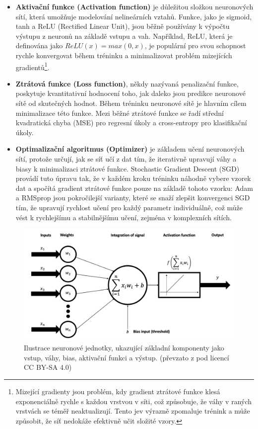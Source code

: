 \documentclass[male,czech,api_ing]{thesis}
\begin{document}
\begin{itemize}
\begin{itemize}
        \end{itemize}
    \item \textbf{Aktivační funkce (Activation function)} je důležitou složkou neuronových sítí, která umožňuje modelování nelineárních vztahů. Funkce, jako je sigmoid, tanh a ReLU (Rectified Linear Unit), jsou běžně používány k výpočtu výstupu z neuronů na základě vstupu a vah. Například, ReLU, která je definována jako $ReLU(x) = max(0, x)$, je populární pro svou schopnost rychle konvergovat během tréninku a minimalizovat problém mizejících gradientů\footnote{Mizející gradienty jsou problém, kdy gradient ztrátové funkce klesá exponenciálně rychle s každou vrstvou v síti, což způsobuje, že váhy v raných vrstvách se téměř neaktualizují. Tento jev výrazně zpomaluje trénink a může způsobit, že síť nedokáže efektivně učit složité vzory.}.
    \item \textbf{Ztrátová funkce (Loss function)}, někdy nazývaná penalizační funkce, poskytuje kvantitativní hodnocení toho, jak daleko jsou predikce neuronové sítě od skutečných hodnot. Během tréninku neuronové sítě je hlavním cílem minimalizace této funkce. Mezi běžné ztrátové funkce se řadí střední kvadratická chyba (MSE) pro regresní úkoly a cross-entropy pro klasifikační úkoly. 
    \item \textbf{Optimalizační algoritmus (Optimizer)} je základem učení neuronových sítí, protože určují, jak se síť učí z dat tím, že iterativně upravují váhy a biasy k minimalizaci ztrátové funkce. Stochastic Gradient Descent (SGD) provádí tuto úpravu tak, že v každém kroku tréninku náhodně vybere vzorek dat a spočítá gradient ztrátové funkce pouze na základě tohoto vzorku:
    Adam a RMSprop jsou pokročilejší varianty, které se snaží zlepšit konvergenci SGD tím, že upravují rychlost učení pro každý parametr individuálně, což může vést k rychlejšímu a stabilnějšímu učení, zejména v komplexních sítích.
\end{itemize}

\begin{figure}[ht]
    \centering
    \includegraphics[width=\linewidth]{Prilohy/Obrazky/NNComponents.png}
    \caption{Ilustrace neuronové jednotky, ukazující základní komponenty jako vstup, váhy, bias, aktivační funkci a výstup. (převzato z \cite{NNComponentsIMG} pod licencí CC BY-SA 4.0)}
    \label{fig:nn_components}
\end{figure}
\end{document}
